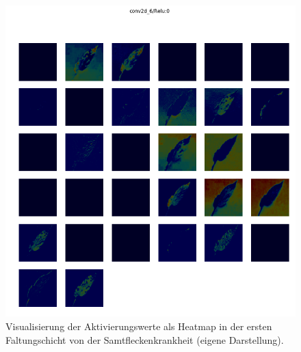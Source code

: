 
\begin{figure}[h!]
	\centering
	\includegraphics[width=\textwidth]{visualisierungen/leaf_mold/heatmap_mit/conv2d_6.png}
	\caption{Visualisierung der Aktivierungswerte als Heatmap in der ersten Faltungschicht von der Samtfleckenkrankheit (eigene Darstellung).}
	\label{}
\end{figure}

